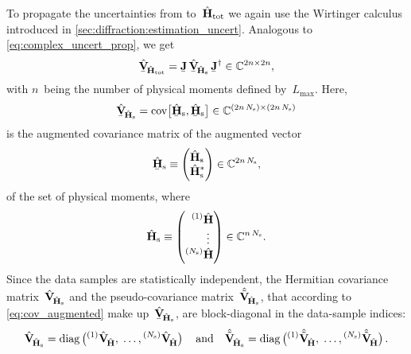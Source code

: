 To propagate the uncertainties from
to~$\hat{\bm{\mathrm{H}}}_\text{tot}$ we again use the Wirtinger calculus
introduced in \cref{sec:diffraction:estimation_uncert}.  Analogous to
\cref{eq:complex_uncert_prop}, we get
\begin{equation}
  \label{eq:photoprod_data_sample_complex_uncert_prop}
  \underaccent{\bar}{\hat{\covMatSym}}_{\!\hat{\vect{H}}_\text{tot}}
  = \underaccent{\bar}{\mat{J}}\, \underaccent{\bar}{\hat{\covMatSym}}_{\!\hat{\vect{H}}_\text{s}}\, \underaccent{\bar}{\mat{J}}^\dagger
  \in \mathbb{C}^{2n \times 2n},
\end{equation}
with $n$~being the number of physical moments defined
by~$L_\text{max}$.   Here,
\begin{equation}
  \underaccent{\bar}{\hat{\covMatSym}}_{\!\hat{\vect{H}}_\text{s}}
  = \cov[1]{\underaccent{\bar}{\hat{\vect{H}}}_\text{s}, \underaccent{\bar}{\hat{\vect{H}}}_\text{s}}
  \in \mathbb{C}^{(2n\, N_\text{s}) \times (2n\, N_\text{s})}
\end{equation}
is the augmented covariance matrix of the augmented vector
\begin{equation}
  \underaccent{\bar}{\hat{\vect{H}}}_\text{s}
  \equiv \begin{pmatrix*}[l]
    \hat{\vect{H}}_\text{s} \\
    \hat{\vect{H}}_\text{s}^*
  \end{pmatrix*}
  \in \mathbb{C}^{2n\, N_\text{s}},
\end{equation}
of the set 
of physical moments, where
\begin{equation}
  \hat{\vect{H}}_\text{s}
  \equiv \begin{pmatrix*}[r]
    \prescript{(1)}{}{\vphantom{\vect{H}}}\hat{\vect{H}} \\
    \vdots~ \\
    \prescript{(N_\text{s})}{}{\vphantom{\vect{H}}}\hat{\vect{H}}
  \end{pmatrix*}
  \in \mathbb{C}^{n\, N_\text{s}}.
\end{equation}
Since the data samples are statistically independent, the Hermitian
covariance matrix~$\hat{\bm{\mathrm{V}}}_{\!\hat{\bm{\mathrm{H}}}_\text{s}}$ and
the pseudo-covariance
matrix~$\hat{\tilde{\bm{\mathrm{V}}}}_{\!\hat{\bm{\mathrm{H}}}_\text{s}}$, that
according to \cref{eq:cov_augmented} make
up~$\underaccent{\bar}{\hat{\covMatSym}}_{\!\hat{\vect{H}}_\text{s}}$,
are block-diagonal in the data-sample indices:
\begin{equation}
  \label{eq:photoprod_data_sample_cov_mats}
  \hat{\covMatSym}_{\!\hat{\vect{H}}_\text{s}}
  = \diag\rBrk[1]{\prescript{(1)}{}{\vphantom{\vect{H}}}\hat{\covMatSym}_{\!\hat{\vect{H}}},\;
  \ldots,
  \prescript{(N_\text{s})}{}{\vphantom{\vect{H}}}\hat{\covMatSym}_{\!\hat{\vect{H}}}}
  \quad\text{and}\quad
  \hat{\tilde{\covMatSym}}_{\!\hat{\vect{H}}_\text{s}}
  = \diag\rBrk[1]{\prescript{(1)}{}{\vphantom{\vect{H}}}\hat{\tilde{\covMatSym}}_{\!\hat{\vect{H}}},\;
  \ldots,
  \prescript{(N_\text{s})}{}{\vphantom{\vect{H}}}\hat{\tilde{\covMatSym}}_{\!\hat{\vect{H}}}}.
\end{equation}
